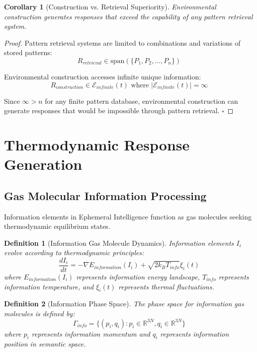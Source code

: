 \documentclass[12pt,a4paper]{article}
\newtheorem{definition}{Definition}
\newtheorem{corollary}{Corollary}
\begin{document}
\begin{corollary}[Construction vs. Retrieval Superiority]
Environmental construction generates responses that exceed the capability of any pattern retrieval system.
\end{corollary}

\begin{proof}
Pattern retrieval systems are limited to combinations and variations of stored patterns:
\begin{equation}
R_{retrieval} \in \text{span}(\{P_1, P_2, \ldots, P_n\})
\end{equation}

Environmental construction accesses infinite unique information:
\begin{equation}
R_{construction} \in \mathcal{E}_{infinite}(t) \text{ where } |\mathcal{E}_{infinite}(t)| = \infty
\end{equation}

Since $\infty > n$ for any finite pattern database, environmental construction can generate responses that would be impossible through pattern retrieval. $\square$
\end{proof}

\section{Thermodynamic Response Generation}

\subsection{Gas Molecular Information Processing}

Information elements in Ephemeral Intelligence function as gas molecules seeking thermodynamic equilibrium states.

\begin{definition}[Information Gas Molecule Dynamics]
Information elements $I_i$ evolve according to thermodynamic principles:
\begin{equation}
\frac{dI_i}{dt} = -\nabla E_{information}(I_i) + \sqrt{2k_B T_{info}} \xi_i(t)
\end{equation}
where $E_{information}(I_i)$ represents information energy landscape, $T_{info}$ represents information temperature, and $\xi_i(t)$ represents thermal fluctuations.
\end{definition}

\begin{definition}[Information Phase Space]
The phase space for information gas molecules is defined by:
\begin{equation}
\Gamma_{info} = \{(p_i, q_i) : p_i \in \mathbb{R}^{3N}, q_i \in \mathbb{R}^{3N}\}
\end{equation}
where $p_i$ represents information momentum and $q_i$ represents information position in semantic space.
\end{definition}
\end{document}
